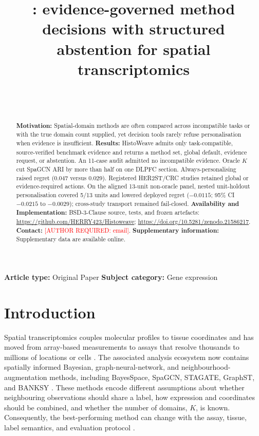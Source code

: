 \documentclass[12pt]{article}
\title{\software: evidence-governed method decisions with structured abstention
for spatial transcriptomics}
\author{
\required{full author names and order}\\
\required{departments, institutions, cities, postal codes, and countries}\\
\required{corresponding author name, email, and ORCID}
}
\date{}
\newcommand{\software}{HistoWeave}
\newcommand{\required}[1]{\textcolor{red}{[AUTHOR REQUIRED: #1]}}
\begin{document}
\maketitle

\noindent\textbf{Article type:} Original Paper \hfill
\textbf{Subject category:} Gene expression

\begin{abstract}
\noindent\textbf{Motivation:} Spatial-domain methods are often compared across
incompatible tasks or with the true domain count supplied, yet decision tools
rarely refuse personalisation when evidence is insufficient.
\textbf{Results:} \software{} admits only task-compatible, source-verified
benchmark evidence and returns a method set, global default, evidence request,
or abstention. An 11-case audit admitted no incompatible evidence. Oracle
\(K\) cut SpaGCN ARI by more than half on one DLPFC section. Always-personalising
raised regret (0.047 versus 0.029). Registered HER2ST/CRC studies retained
global or evidence-required actions. On the aligned 13-unit non-oracle panel,
nested unit-holdout personalisation covered 5/13 units and lowered deployed
regret ($-0.0115$; 95\% CI $-0.0215$ to $-0.0029$); cross-study transport
remained fail-closed.
\textbf{Availability and Implementation:} BSD-3-Clause source, tests, and
frozen artefacts: \url{https://github.com/HERRY423/Histoweave};
\url{https://doi.org/10.5281/zenodo.21586217}.
\textbf{Contact:} \required{email}.
\textbf{Supplementary information:} Supplementary data are available online.
\end{abstract}

\section{Introduction}

Spatial transcriptomics couples molecular profiles to tissue coordinates and
has moved from array-based measurements to assays that resolve thousands to
millions of locations or cells \citep{stahl2016,maynard2021,chen2022,moses2022}.
The associated analysis ecosystem now contains spatially informed Bayesian,
graph-neural-network, and neighbourhood-augmentation methods, including
BayesSpace, SpaGCN, STAGATE, GraphST, and BANKSY
\citep{zhao2021,hu2021,dong2022,long2023,singhal2024}. These methods encode
different assumptions about whether neighbouring observations should share a
label, how expression and coordinates should be combined, and whether the
number of domains, \(K\), is known. Consequently, the best-performing method
can change with the assay, tissue, label semantics, and evaluation protocol
\citep{yuan2024}.
\end{document}
